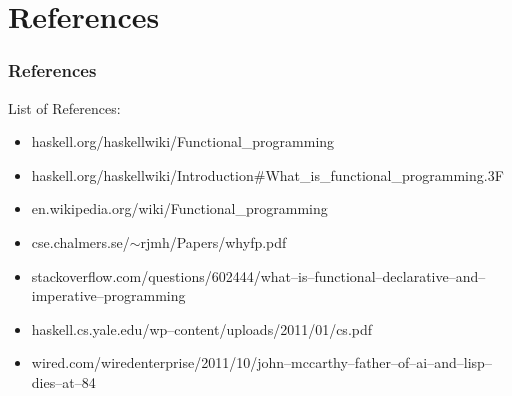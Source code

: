 \documentclass[presentation.tex]{subfiles}
\begin{document}
\section{References}
\begin{frame}
  \frametitle{References}
  List of References:
  \tiny
  \begin{itemize}
    \item haskell.org/haskellwiki/Functional\_programming
    \item haskell.org/haskellwiki/Introduction#What\_is\_functional\_programming.3F
    \item en.wikipedia.org/wiki/Functional\_programming
    \item cse.chalmers.se/$\sim$rjmh/Papers/whyfp.pdf
    \item stackoverflow.com/questions/602444/what--is--functional--declarative--and--imperative--programming
    \item haskell.cs.yale.edu/wp--content/uploads/2011/01/cs.pdf
    \item wired.com/wiredenterprise/2011/10/john--mccarthy--father--of--ai--and--lisp--dies--at--84
  \end{itemize}
  \normalsize
\end{frame}
\end{document}
